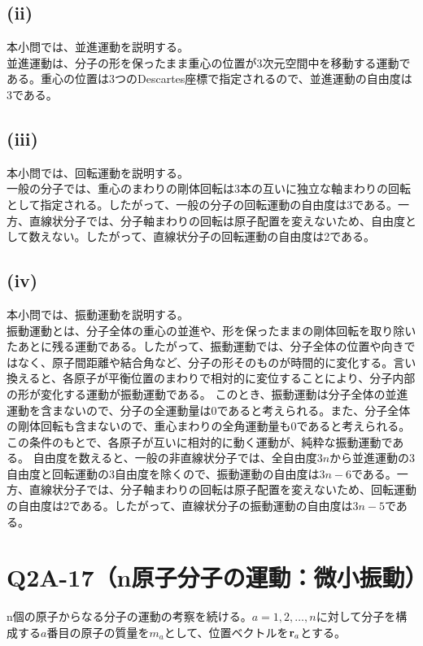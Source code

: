   \subsection*{(ii)}
  本小問では、並進運動を説明する。\\
  並進運動は、分子の形を保ったまま重心の位置が3次元空間中を移動する運動である。重心の位置は3つのDescartes座標で指定されるので、並進運動の自由度は3である。
  
  \subsection*{(iii)}
  本小問では、回転運動を説明する。\\
  一般の分子では、重心のまわりの剛体回転は3本の互いに独立な軸まわりの回転として指定される。したがって、一般の分子の回転運動の自由度は3である。一方、直線状分子では、分子軸まわりの回転は原子配置を変えないため、自由度として数えない。したがって、直線状分子の回転運動の自由度は2である。
  
  \subsection*{(iv)}
  本小問では、振動運動を説明する。\\
  振動運動とは、分子全体の重心の並進や、形を保ったままの剛体回転を取り除いたあとに残る運動である。したがって、振動運動では、分子全体の位置や向きではなく、原子間距離や結合角など、分子の形そのものが時間的に変化する。言い換えると、各原子が平衡位置のまわりで相対的に変位することにより、分子内部の形が変化する運動が振動運動である。
  このとき、振動運動は分子全体の並進運動を含まないので、分子の全運動量は0であると考えられる。また、分子全体の剛体回転も含まないので、重心まわりの全角運動量も0であると考えられる。この条件のもとで、各原子が互いに相対的に動く運動が、純粋な振動運動である。
  自由度を数えると、一般の非直線状分子では、全自由度$3n$から並進運動の3自由度と回転運動の3自由度を除くので、振動運動の自由度は$3n-6$である。一方、直線状分子では、分子軸まわりの回転は原子配置を変えないため、回転運動の自由度は2である。したがって、直線状分子の振動運動の自由度は$3n-5$である。
    
  \section{Q2A-17（n原子分子の運動：微小振動）}
  n個の原子からなる分子の運動の考察を続ける。$a=1,2,\dots,n$に対して分子を構成する$a$番目の原子の質量を$m_a$として、位置ベクトルを$\boldsymbol{\mathrm{r}}_a$とする。
  
